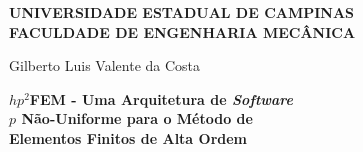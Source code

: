 \clearpage
\setcounter{page}{3}

\thispagestyle{fancy}
\fancyhf{}
\cfoot{\thepage}


\begin{center}
\vspace*{2.2cm}
{\large\textbf{UNIVERSIDADE ESTADUAL DE CAMPINAS\\\vspace{1.2ex}
FACULDADE DE ENGENHARIA MECÂNICA\vspace{1.2ex}}}

\vspace{1.5cm}
{\large Gilberto Luis Valente da Costa}

\vspace{1.3cm}
{\fontsize{23}{23} \textbf{$hp^2$FEM - Uma Arquitetura de \textit{Software}}}	\\ \vspace{1.2ex}
{\fontsize{23}{23} \textbf{$p$ Não-Uniforme para o Método de}}			\\ \vspace{1.2ex}
{\fontsize{23}{23} \textbf{Elementos Finitos de Alta Ordem}}
\end{center}


